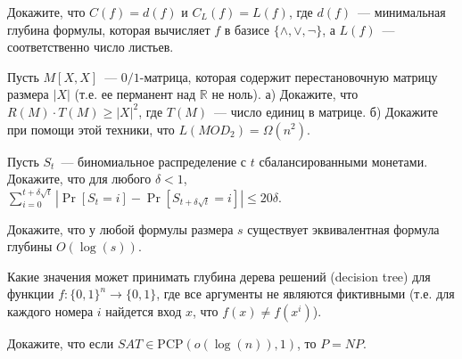 \begin{task}
    Докажите, что $C(f) = d(f)$ и $C_L(f) = L(f)$, где $d(f)$~--- минимальная глубина формулы, которая вычисляет $f$ в базисе
    $\{\land, \lor, \neg\}$, а $L(f)$~--- соответственно число листьев.
\end{task}

\begin{task}
    Пусть $M[X, X]$~--- $0 / 1$-матрица, которая содержит перестановочную матрицу размера $|X|$ (т.е. ее перманент над
    $\mathbb{R}$ не ноль). а) Докажите, что $R(M) \cdot T(M) \ge |X|^2$, где $T(M)$~--- число единиц в матрице. б) Докажите при
    помощи этой техники, что $L(MOD_2) = \Omega(n^2)$.
\end{task}


\begin{task}
    Пусть $S_t$~--- биномиальное распределение с $t$ сбалансированными монетами. Докажите, что для любого $\delta < 1$,
    $\sum\limits_{i = 0}^{t + \delta \sqrt{t}} |\Pr[S_t = i] - \Pr[S_{t + \delta \sqrt{t}} = i]| \le 20 \delta$.
\end{task}


\breakline

\begin{ptask}{9}
    Докажите, что у любой формулы размера $s$ существует эквивалентная формула глубины $O(\log(s))$.
\end{ptask}

\begin{ptask}{10}
    Какие значения может принимать глубина дерева решений (decision tree) для функции $f: \{0, 1\}^n \rightarrow \{0, 1\}$, где
    все аргументы не являются фиктивными (т.е. для каждого номера $i$ найдется вход $x$, что $f(x) \neq f(x^{i})$).
\end{ptask}

\begin{ptask}{14}
    Докажите, что если $SAT \in \mathrm{PCP}(o(\log(n)), 1)$, то $P = NP$.
\end{ptask}

